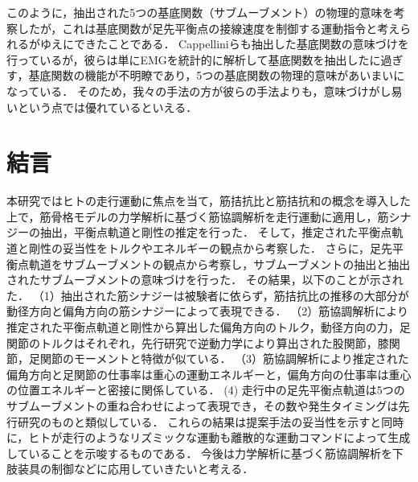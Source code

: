 このように，抽出された5つの基底関数（サブムーブメント）の物理的意味を考察したが，これは基底関数が足先平衡点の接線速度を制御する運動指令と考えられるがゆえにできたことである．
Cappelliniらも抽出した基底関数の意味づけを行っているが\cite{Cappellini2006}，彼らは単にEMGを統計的に解析して基底関数を抽出したに過ぎす，基底関数の機能が不明瞭であり，5つの基底関数の物理的意味があいまいになっている．
そのため，我々の手法の方が彼らの手法よりも，意味づけがし易いという点では優れているといえる．

\section{結言}
本研究ではヒトの走行運動に焦点を当て，筋拮抗比と筋拮抗和の概念を導入した上で，筋骨格モデルの力学解析に基づく筋協調解析を走行運動に適用し，筋シナジーの抽出，平衡点軌道と剛性の推定を行った．
そして，推定された平衡点軌道と剛性の妥当性をトルクやエネルギーの観点から考察した．
さらに，足先平衡点軌道をサブムーブメントの観点から考察し，サブムーブメントの抽出と抽出されたサブムーブメントの意味づけを行った．
その結果，以下のことが示された．
（1）抽出された筋シナジーは被験者に依らず，筋拮抗比の推移の大部分が動径方向と偏角方向の筋シナジーによって表現できる．
（2）筋協調解析により推定された平衡点軌道と剛性から算出した偏角方向のトルク，動径方向の力，足関節のトルクはそれぞれ，先行研究で逆動力学により算出された股関節，膝関節，足関節のモーメントと特徴が似ている．
（3）筋協調解析により推定された偏角方向と足関節の仕事率は重心の運動エネルギーと，偏角方向の仕事率は重心の位置エネルギーと密接に関係している．
 (4) 走行中の足先平衡点軌道は5つのサブムーブメントの重ね合わせによって表現でき，その数や発生タイミングは先行研究のものと類似している．
これらの結果は提案手法の妥当性を示すと同時に，ヒトが走行のようなリズミックな運動も離散的な運動コマンドによって生成していることを示唆するものである．
今後は力学解析に基づく筋協調解析を下肢装具の制御などに応用していきたいと考える．


